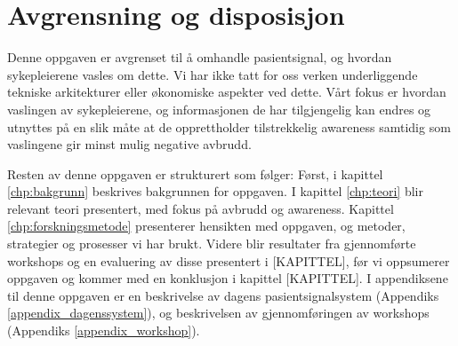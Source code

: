 \section{Avgrensning og disposisjon}
Denne oppgaven er avgrenset til å omhandle pasientsignal, og hvordan sykepleierene vasles om dette. Vi har ikke tatt for oss verken underliggende tekniske arkitekturer eller økonomiske aspekter ved dette. Vårt fokus er hvordan vaslingen av sykepleierene, og informasjonen de har tilgjengelig kan endres og utnyttes på en slik måte at de opprettholder tilstrekkelig awareness samtidig som vaslingene gir minst mulig negative avbrudd.

\noindent
Resten av denne oppgaven er strukturert som følger: Først, i kapittel \ref{chp:bakgrunn} beskrives bakgrunnen for oppgaven. I kapittel \ref{chp:teori} blir relevant teori presentert, med fokus på avbrudd og awareness. Kapittel \ref{chp:forskningsmetode} presenterer hensikten med oppgaven, og metoder, strategier og prosesser vi har brukt. Videre blir resultater fra gjennomførte workshops og en evaluering av disse presentert i [KAPITTEL], før vi oppsumerer oppgaven og kommer med en konklusjon i kapittel [KAPITTEL]. I appendiksene til denne oppgaven er en beskrivelse av dagens pasientsignalsystem (Appendiks \ref{appendix_dagenssystem}), og beskrivelsen av gjennomføringen av workshops (Appendiks \ref{appendix_workshop}).